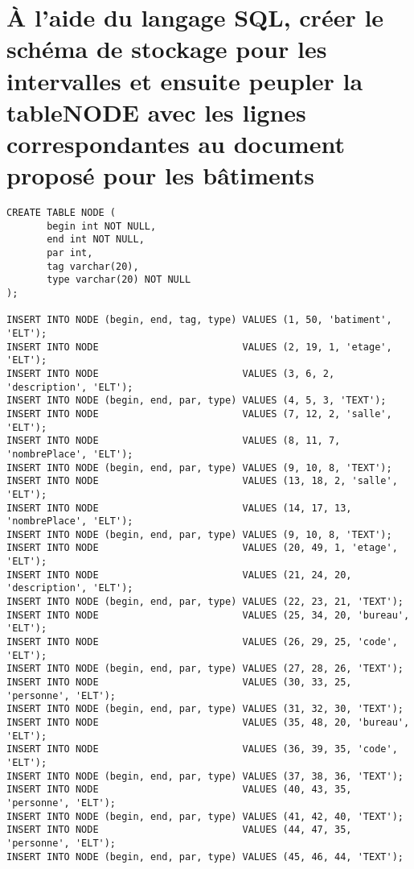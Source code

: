 \section{À  l’aide  du  langage  SQL,  créer  le  schéma  de  stockage  pour  les  intervalles  et  ensuite  peupler  la  tableNODE avec les lignes correspondantes au document proposé pour les bâtiments}
\begin{verbatim}
CREATE TABLE NODE (
       begin int NOT NULL,
       end int NOT NULL,
       par int,
       tag varchar(20),
       type varchar(20) NOT NULL
);

INSERT INTO NODE (begin, end, tag, type) VALUES (1, 50, 'batiment', 'ELT');
INSERT INTO NODE                         VALUES (2, 19, 1, 'etage', 'ELT');
INSERT INTO NODE                         VALUES (3, 6, 2, 'description', 'ELT');
INSERT INTO NODE (begin, end, par, type) VALUES (4, 5, 3, 'TEXT');
INSERT INTO NODE                         VALUES (7, 12, 2, 'salle', 'ELT');
INSERT INTO NODE                         VALUES (8, 11, 7, 'nombrePlace', 'ELT');
INSERT INTO NODE (begin, end, par, type) VALUES (9, 10, 8, 'TEXT');
INSERT INTO NODE                         VALUES (13, 18, 2, 'salle', 'ELT');
INSERT INTO NODE                         VALUES (14, 17, 13, 'nombrePlace', 'ELT');
INSERT INTO NODE (begin, end, par, type) VALUES (9, 10, 8, 'TEXT');
INSERT INTO NODE                         VALUES (20, 49, 1, 'etage', 'ELT');
INSERT INTO NODE                         VALUES (21, 24, 20, 'description', 'ELT');
INSERT INTO NODE (begin, end, par, type) VALUES (22, 23, 21, 'TEXT');
INSERT INTO NODE                         VALUES (25, 34, 20, 'bureau', 'ELT');
INSERT INTO NODE                         VALUES (26, 29, 25, 'code', 'ELT');
INSERT INTO NODE (begin, end, par, type) VALUES (27, 28, 26, 'TEXT');
INSERT INTO NODE                         VALUES (30, 33, 25, 'personne', 'ELT');
INSERT INTO NODE (begin, end, par, type) VALUES (31, 32, 30, 'TEXT');
INSERT INTO NODE                         VALUES (35, 48, 20, 'bureau', 'ELT');
INSERT INTO NODE                         VALUES (36, 39, 35, 'code', 'ELT');
INSERT INTO NODE (begin, end, par, type) VALUES (37, 38, 36, 'TEXT');
INSERT INTO NODE                         VALUES (40, 43, 35, 'personne', 'ELT');
INSERT INTO NODE (begin, end, par, type) VALUES (41, 42, 40, 'TEXT');
INSERT INTO NODE                         VALUES (44, 47, 35, 'personne', 'ELT');
INSERT INTO NODE (begin, end, par, type) VALUES (45, 46, 44, 'TEXT');
\end{verbatim}

